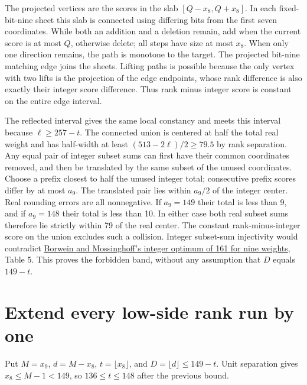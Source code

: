 \documentclass[11pt,letterpaper]{article}
\begin{document}
The projected vertices are the scores in the slab \([Q-x_8,Q+x_8]\). In
each fixed-bit-nine sheet this slab is connected using differing bits
from the first seven coordinates. While both an addition and a deletion
remain, add when the current score is at most \(Q\), otherwise delete;
all steps have size at most \(x_8\). When only one direction remains,
the path is monotone to the target. The projected bit-nine matching edge
joins the sheets. Lifting paths is possible because the only vertex with
two lifts is the projection of the edge endpoints, whose rank difference
is also exactly their integer score difference. Thus rank minus integer
score is constant on the entire edge interval.

The reflected interval gives the same local constancy and meets this
interval because \(\ell\ge257-t\). The connected union is centered at
half the total real weight and has half-width at least
\((513-2\ell)/2\ge79.5\) by rank separation. Any equal pair of integer
subset sums can first have their common coordinates removed, and then be
translated by the same subset of the unused coordinates. Choose a prefix
closest to half the unused integer total; consecutive prefix scores
differ by at most \(a_9\). The translated pair lies within \(a_9/2\) of
the integer center. Real rounding errors are all nonnegative. If
\(a_9=149\) their total is less than 9, and if \(a_9=148\) their total
is less than 10. In either case both real subset sums therefore lie
strictly within 79 of the real center. The constant rank-minus-integer
score on the union excludes such a collision. Integer subset-sum
injectivity would contradict
\href{https://www.cecm.sfu.ca/~pborwein/PAPERS/P170.pdf}{Borwein and
Mossinghoff's integer optimum of 161 for nine weights}, Table 5. This
proves the forbidden band, without any assumption that \(D\) equals
\(149-t\).

\section{Extend every low-side rank run by
one}\label{extend-every-low-side-rank-run-by-one}

Put \(M=x_9\), \(d=M-x_8\), \(t=\lfloor x_8\rfloor\), and
\(D=\lfloor d\rfloor\le149-t\). Unit separation gives
\(x_8\le M-1<149\), so \(136\le t\le148\) after the previous bound.
\end{document}
